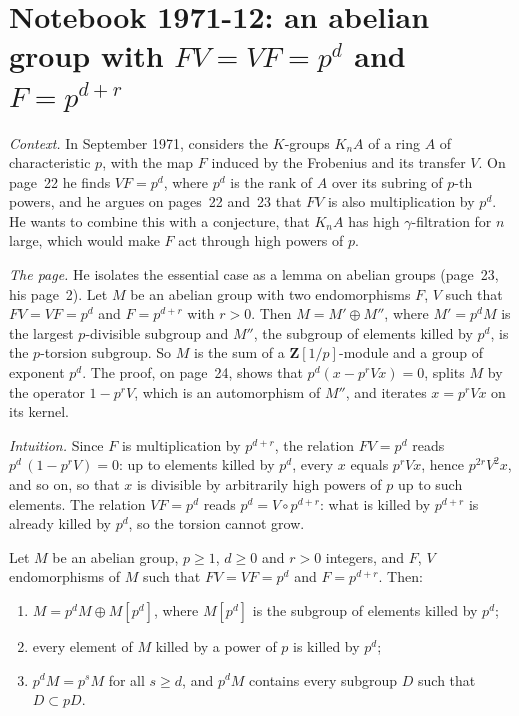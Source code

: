\section[Notebook 1971-12: a group with $FV = VF = p^d$ and $F = p^{d+r}$]{Notebook 1971-12: an abelian group with $FV = VF = p^d$ and $F = p^{d+r}$\protect{}}\label{sec:quillen-1971-12}

\emph{Context.} In September 1971,  considers the $K$-groups $K_nA$ of a ring $A$ of characteristic $p$, with the map $F$ induced by the Frobenius and its transfer $V$. On page~22 he finds $VF = p^d$, where $p^d$ is the rank of $A$ over its subring of $p$-th powers, and he argues on pages~22 and~23 that $FV$ is also multiplication by $p^d$. He wants to combine this with a conjecture, that $K_nA$ has high $\gamma$-filtration for $n$ large, which would make $F$ act through high powers of $p$.

\emph{The page.} He isolates the essential case as a lemma on abelian groups (page~23, his page~2). Let $M$ be an abelian group with two endomorphisms $F$, $V$ such that $FV = VF = p^d$ and $F = p^{d+r}$ with $r > 0$. Then $M = M' \oplus M''$, where $M' = p^dM$ is the largest $p$-divisible subgroup and $M''$, the subgroup of elements killed by $p^d$, is the $p$-torsion subgroup. So $M$ is the sum of a $\mathbf Z[1/p]$-module and a group of exponent $p^d$. The proof, on page~24, shows that $p^d(x - p^rVx) = 0$, splits $M$ by the operator $1 - p^rV$, which is an automorphism of $M''$, and iterates $x = p^rVx$ on its kernel.

\emph{Intuition.} Since $F$ is multiplication by $p^{d+r}$, the relation $FV = p^d$ reads $p^d\,(1 - p^rV) = 0$: up to elements killed by $p^d$, every $x$ equals $p^rVx$, hence $p^{2r}V^2x$, and so on, so that $x$ is divisible by arbitrarily high powers of $p$ up to such elements. The relation $VF = p^d$ reads $p^d = V \circ p^{d+r}$: what is killed by $p^{d+r}$ is already killed by $p^d$, so the torsion cannot grow.

\begin{encadre}
\begin{theoreme}\label{thm:quillen-1971-12}
Let $M$ be an abelian group, $p \ge 1$, $d \ge 0$ and $r > 0$ integers, and $F$, $V$ endomorphisms of $M$ such that $FV = VF = p^d$ and $F = p^{d+r}$. Then:
\begin{enumerate}
\item[\emph{(a)}] $M = p^dM \oplus M[p^d]$, where $M[p^d]$ is the subgroup of elements killed by $p^d$;
\item[\emph{(b)}] every element of $M$ killed by a power of $p$ is killed by $p^d$;
\item[\emph{(c)}] $p^dM = p^sM$ for all $s \ge d$, and $p^dM$ contains every subgroup $D$ such that $D \subset pD$.
\end{enumerate}
\end{theoreme}
\end{encadre}

